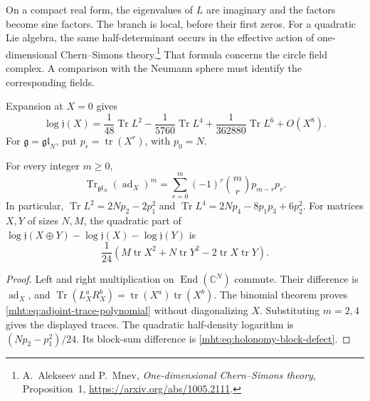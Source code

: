 On a compact real form, the eigenvalues of $L$ are imaginary
and the factors become sine factors. The branch is local,
before their first zeros. For a quadratic Lie algebra, the
same half-determinant occurs in the effective action of
one-dimensional Chern--Simons theory.\footnote{A.~Alekseev
and P.~Mnev, \emph{One-dimensional Chern--Simons theory},
Proposition~1, \url{https://arxiv.org/abs/1005.2111}.}
That formula concerns the circle field complex. A comparison
with the Neumann sphere must identify the corresponding fields.

Expansion at $X=0$ gives
\begin{equation}\label{mht:eq:holonomy-density-expansion}
 \log\mathfrak j(X)=\frac1{48}\operatorname{Tr}L^2
       -\frac1{5760}\operatorname{Tr}L^4
       +\frac1{362880}\operatorname{Tr}L^6+O(X^8).
\end{equation}
For $\mathfrak g=\mathfrak{gl}_N$, put
$p_r=\operatorname{tr}(X^r)$, with $p_0=N$.

\begin{proposition}\label{mht:prop:holonomy-block-defect}
For every integer $m\geq0$,
\begin{equation}\label{mht:eq:adjoint-trace-polynomial}
 \operatorname{Tr}_{\mathfrak{gl}_N}(\operatorname{ad}_X)^m
       =\sum_{r=0}^m(-1)^r\binom mr p_{m-r}p_r.
\end{equation}
In particular, $\operatorname{Tr}L^2=2Np_2-2p_1^2$ and
$\operatorname{Tr}L^4=2Np_4-8p_1p_3+6p_2^2$.
For matrices $X,Y$ of sizes $N,M$, the quadratic part of
$\log\mathfrak j(X\oplus Y)-\log\mathfrak j(X)
-\log\mathfrak j(Y)$ is
\begin{equation}\label{mht:eq:holonomy-block-defect}
 \frac1{24}\left(M\operatorname{tr}X^2
        +N\operatorname{tr}Y^2
        -2\operatorname{tr}X\operatorname{tr}Y\right).
\end{equation}
\end{proposition}

\begin{proof}
Left and right multiplication on $\operatorname{End}(\mathbb C^N)$
commute. Their difference is $\operatorname{ad}_X$, and
$\operatorname{Tr}(L_X^aR_X^b)
=\operatorname{tr}(X^a)\operatorname{tr}(X^b)$.
The binomial theorem proves \eqref{mht:eq:adjoint-trace-polynomial}
without diagonalizing $X$.
Substituting $m=2,4$ gives the displayed traces.
The quadratic half-density logarithm is $(Np_2-p_1^2)/24$.
Its block-sum difference is \eqref{mht:eq:holonomy-block-defect}.
\end{proof}

